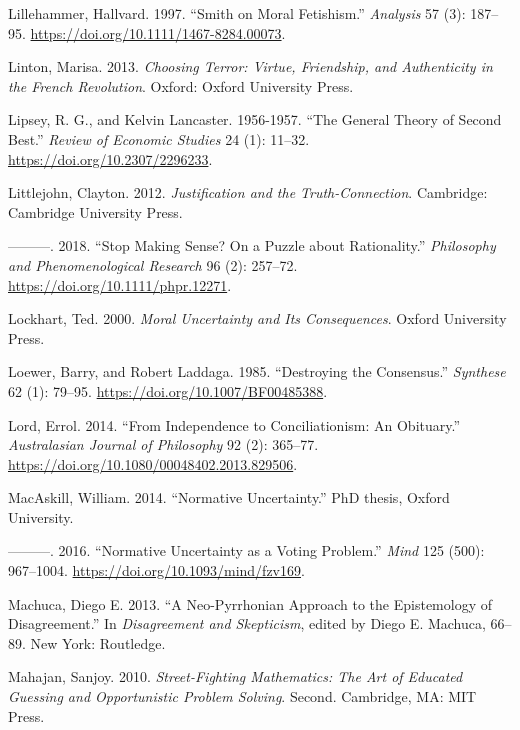 \documentclass[
  10pt,
  letterpaper,
  twoside]{scrbook}
\newlength{\cslhangindent}
\newenvironment{CSLReferences}[2] %
 {\begin{list}{}{%
  \setlength{\itemindent}{0pt}
  \setlength{\leftmargin}{0pt}
  \setlength{\parsep}{0pt}
  \ifodd #1
   \setlength{\leftmargin}{\cslhangindent}
   \setlength{\itemindent}{-1\cslhangindent}
  \fi
  \setlength{\itemsep}{#2\baselineskip}}}
 {\end{list}}
\begin{document}
\begin{CSLReferences}{1}{0}
Lillehammer, Hallvard. 1997. {``Smith on Moral Fetishism.''}
\emph{Analysis} 57 (3): 187--95.
\url{https://doi.org/10.1111/1467-8284.00073}.

Linton, Marisa. 2013. \emph{Choosing Terror: Virtue, Friendship, and
Authenticity in the French Revolution}. Oxford: {O}xford {U}niversity
{P}ress.

Lipsey, R. G., and Kelvin Lancaster. 1956-1957. {``The General Theory of
Second Best.''} \emph{Review of Economic Studies} 24 (1): 11--32.
\url{https://doi.org/10.2307/2296233}.

Littlejohn, Clayton. 2012. \emph{Justification and the
Truth-Connection}. Cambridge: Cambridge University Press.

---------. 2018. {``Stop Making Sense? On a Puzzle about Rationality.''}
\emph{Philosophy and Phenomenological Research} 96 (2): 257--72.
\url{https://doi.org/10.1111/phpr.12271}.

Lockhart, Ted. 2000. \emph{Moral Uncertainty and Its Consequences}.
Oxford University Press.

Loewer, Barry, and Robert Laddaga. 1985. {``Destroying the Consensus.''}
\emph{Synthese} 62 (1): 79--95.
\url{https://doi.org/10.1007/BF00485388}.

Lord, Errol. 2014. {``From Independence to Conciliationism: An
Obituary.''} \emph{Australasian Journal of Philosophy} 92 (2): 365--77.
\url{https://doi.org/10.1080/00048402.2013.829506}.

MacAskill, William. 2014. {``Normative Uncertainty.''} PhD thesis,
Oxford University.

---------. 2016. {``Normative Uncertainty as a Voting Problem.''}
\emph{Mind} 125 (500): 967--1004.
\url{https://doi.org/10.1093/mind/fzv169}.

Machuca, Diego E. 2013. {``A Neo-Pyrrhonian Approach to the Epistemology
of Disagreement.''} In \emph{Disagreement and Skepticism}, edited by
Diego E. Machuca, 66--89. New York: Routledge.

Mahajan, Sanjoy. 2010. \emph{Street-Fighting Mathematics: The Art of
Educated Guessing and Opportunistic Problem Solving}. Second. Cambridge,
MA: {MIT} Press.


\end{CSLReferences}
\end{document}
